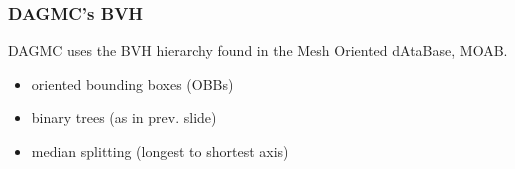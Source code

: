 \documentclass[12pt]{beamer}
\begin{document}
\begin{frame}
\frametitle{DAGMC's BVH}

DAGMC uses the BVH hierarchy found in the Mesh Oriented dAtaBase, MOAB.
\begin{center}
\end{center}

\begin{itemize}
\item oriented bounding boxes (OBBs)
\item binary trees (as in prev. slide)
\item median splitting (longest to shortest axis)
\end{itemize}

\end{frame}
\end{document}
